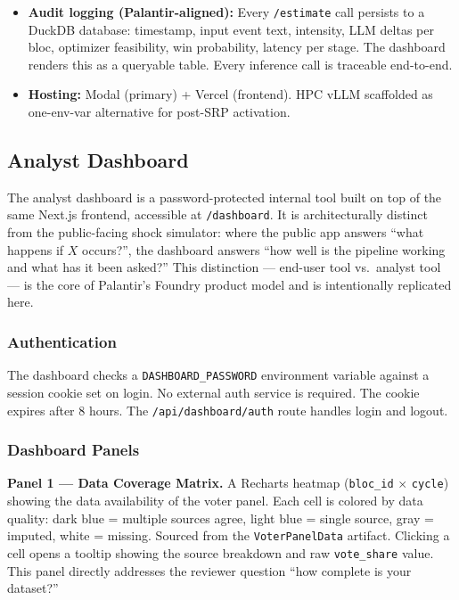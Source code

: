 \documentclass[11pt]{article}
\begin{document}
\begin{itemize}[leftmargin=1.6em, itemsep=3pt]
  \item \textbf{Audit logging (Palantir-aligned):} Every \texttt{/estimate} call
        persists to a DuckDB database: timestamp, input event text, intensity,
        LLM deltas per bloc, optimizer feasibility, win probability, latency per
        stage. The dashboard renders this as a queryable table. Every inference
        call is traceable end-to-end.

  \item \textbf{Hosting:} Modal (primary) + Vercel (frontend). HPC vLLM scaffolded
        as one-env-var alternative for post-SRP activation.
\end{itemize}

\subsection*{Analyst Dashboard}

The analyst dashboard is a password-protected internal tool built on top of the same
Next.js frontend, accessible at \texttt{/dashboard}. It is architecturally distinct
from the public-facing shock simulator: where the public app answers ``what happens
if $X$ occurs?'', the dashboard answers ``how well is the pipeline working and what
has it been asked?'' This distinction --- end-user tool vs.\ analyst tool --- is the
core of Palantir's Foundry product model and is intentionally replicated here.

\subsubsection*{Authentication}

The dashboard checks a \texttt{DASHBOARD\_PASSWORD} environment variable against a
session cookie set on login. No external auth service is required. The cookie expires
after 8 hours. The \texttt{/api/dashboard/auth} route handles login and logout.

\subsubsection*{Dashboard Panels}

\textbf{Panel 1 --- Data Coverage Matrix.}
A Recharts heatmap (\texttt{bloc\_id} $\times$ \texttt{cycle}) showing the data
availability of the voter panel. Each cell is colored by data quality: dark blue
= multiple sources agree, light blue = single source, gray = imputed, white =
missing. Sourced from the \texttt{VoterPanelData} artifact. Clicking a cell opens
a tooltip showing the source breakdown and raw \texttt{vote\_share} value. This
panel directly addresses the reviewer question ``how complete is your dataset?''
\end{document}
